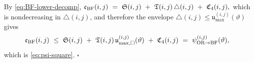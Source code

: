 \documentclass[twoside,11pt]{article}
\numberwithin{equation}{section}
\numberwithin{theorem}{section}
\numberwithin{example}{section}
\begin{document}
By \eqref{eq:BF-lower-decomp},
\(
\mathfrak c_{\rm BF}(i,j)\ =\ \mathfrak S(i,j)\ +\ \mathfrak T(i,j)\,\triangle(i,j)\ +\ \mathfrak C_4(i,j),
\)
which is nondecreasing in $\triangle(i,j)$, and therefore the envelope $\triangle(i,j)\le \mathfrak u_{\max}^{(i,j)}(\vartheta)$ gives
\[
\mathfrak c_{\rm BF}(i,j)
\ \le\ \mathfrak S(i,j)\ +\ \mathfrak T(i,j)\,\mathfrak u_{\max,\square}^{(i,j)}(\vartheta)\ +\ \mathfrak C_4(i,j)
\ =\ \psi^{(i,j)}_{\rm OR\to BF}(\vartheta),
\]
which is \eqref{eq:psi-square}.
\hfill $\square$
\end{document}
